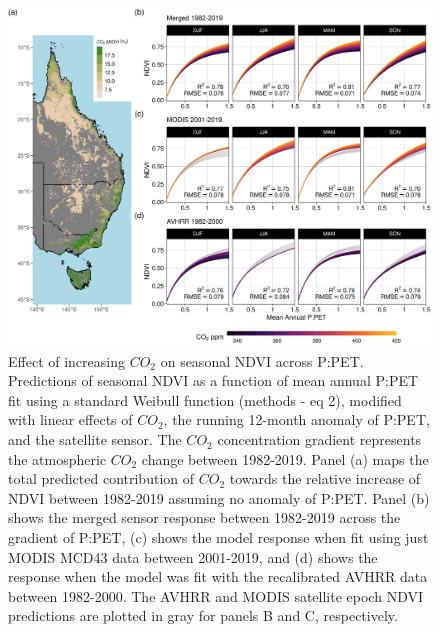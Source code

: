 \documentclass[
]{article}
\begin{document}
\begin{figure}
\includegraphics[width=14cm]{../../figures/Fig5_n4_ndvi_map_weibull_ppet_x_co2_modeled_effect} \caption{Effect of increasing $CO_2$ on seasonal NDVI across P:PET. Predictions of seasonal NDVI as a function of mean annual P:PET fit using a standard Weibull function (methods - eq 2), modified with linear effects of $CO_2$, the running 12-month anomaly of P:PET, and the satellite sensor. The $CO_2$ concentration gradient represents the atmospheric $CO_2$ change between 1982-2019. Panel (a) maps the total predicted contribution of $CO_2$ towards the relative increase of NDVI between 1982-2019 assuming no anomaly of P:PET. Panel (b) shows the merged sensor response between 1982-2019 across the gradient of P:PET, (c) shows the model response when fit using just MODIS MCD43 data between 2001-2019, and (d) shows the response when the model was fit with the recalibrated AVHRR data between 1982-2000. The AVHRR and MODIS satellite epoch NDVI predictions are plotted in gray for panels B and C, respectively.}\label{fig:unnamed-chunk-4}
\end{figure}
\clearpage
\end{document}
